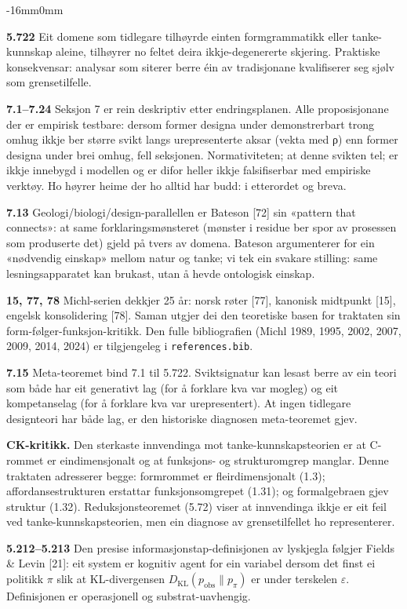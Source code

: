 \documentclass[10pt,oneside]{book}
\newcommand{\msym}[1]{{\mathfbfont #1}}
\newenvironment{widebody}{%
  \begin{adjustwidth}{-16mm}{0mm}%
}{%
  \end{adjustwidth}%
}
\begin{document}
\begin{widebody}
{\textbf{5.722} Eit domene som tidlegare tilhøyrde einten formgrammatikk eller tanke-kunnskap aleine, tilhøyrer no feltet deira ikkje-degenererte skjering. Praktiske konsekvensar: analysar som siterer berre éin av tradisjonane kvalifiserer seg sjølv som grensetilfelle.

\textbf{7.1--7.24} Seksjon 7 er rein deskriptiv etter endringsplanen. Alle proposisjonane der er empirisk testbare: dersom former designa under demonstrerbart trong omhug ikkje ber større svikt langs urepresenterte aksar (vekta med \msym{ρ}) enn former designa under brei omhug, fell seksjonen. Normativiteten; at denne svikten tel; er ikkje innebygd i modellen og er difor heller ikkje falsifiserbar med empiriske verktøy. Ho høyrer heime der ho alltid har budd: i etterordet og breva.

\textbf{7.13} Geologi/biologi/design-parallellen er Bateson [72] sin «pattern that connects»: at same forklaringsmønsteret (mønster i residue ber spor av prosessen som produserte det) gjeld på tvers av domena. Bateson argumenterer for ein «nødvendig einskap» mellom natur og tanke; vi tek ein svakare stilling: same lesningsapparatet kan brukast, utan å hevde ontologisk einskap.

\textbf{15, 77, 78} Michl-serien dekkjer 25 år: norsk røter [77], kanonisk midtpunkt [15], engelsk konsolidering [78]. Saman utgjer dei den teoretiske basen for traktaten sin form-følger-funksjon-kritikk. Den fulle bibliografien (Michl 1989, 1995, 2002, 2007, 2009, 2014, 2024) er tilgjengeleg i \texttt{references.bib}.

\textbf{7.15} Meta-teoremet bind 7.1 til 5.722. Sviktsignatur kan lesast berre av ein teori som både har eit generativt lag (for å forklare kva var mogleg) og eit kompetanselag (for å forklare kva var urepresentert). At ingen tidlegare designteori har både lag, er den historiske diagnosen meta-teoremet gjev.

\textbf{CK-kritikk.} Den sterkaste innvendinga mot tanke-kunnskapsteorien er at C-rommet er eindimensjonalt og at funksjons- og strukturomgrep manglar. Denne traktaten adresserer begge: formrommet er fleirdimensjonalt (1.3); affordansestrukturen erstattar funksjonsomgrepet (1.31); og formalgebraen gjev struktur (1.32). Reduksjonsteoremet (5.72) viser at innvendinga ikkje er eit feil ved tanke-kunnskapsteorien, men ein diagnose av grensetilfellet ho representerer.

\bigskip
\textbf{5.212--5.213} Den presise informasjonstap-definisjonen av lyskjegla følgjer Fields \& Levin [21]: eit system er kognitiv agent for ein variabel dersom det finst ei politikk \(\pi\) slik at KL-divergensen \(D_{\mathrm{KL}}(p_{\mathrm{obs}} \| p_{\pi})\) er under terskelen \(\varepsilon\). Definisjonen er operasjonell og substrat-uavhengig.

}
\end{widebody}
\end{document}
